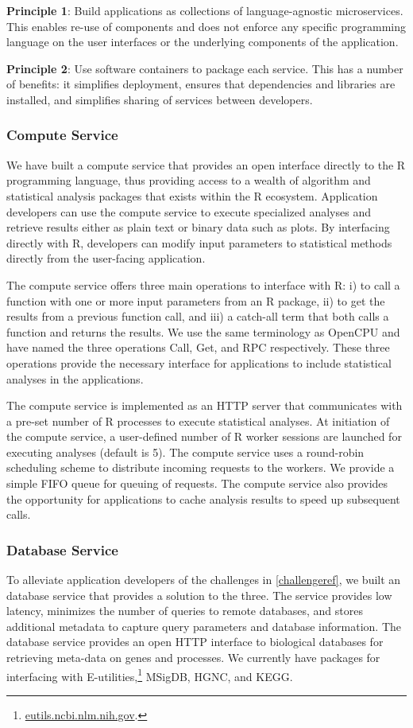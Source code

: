 \textbf{Principle 1}: Build applications as collections of language-agnostic
microservices. This enables re-use of components and does not enforce any
specific programming language on the user interfaces or the underlying
components of the application. 

\textbf{Principle 2}: Use software containers to package each service. This has
a number of benefits: it simplifies deployment, ensures that dependencies and
libraries are installed, and  simplifies sharing of services between
developers. 

\subsubsection{Compute Service}
We have built a compute service that provides an open interface directly to the
R programming language, thus providing access to a wealth of algorithm and
statistical analysis packages that exists within the R ecosystem.  
Application developers can use the compute service to execute specialized
analyses and retrieve results either as plain text or binary data such as plots.
By interfacing directly with R, developers can modify input parameters to
statistical methods directly from the user-facing application. 

The compute service offers three main operations to interface with R: i) to call
a function with one or more input parameters from an R package, ii) to get the
results from a previous function call, and iii) a catch-all term that both calls
a function and returns the results.  We use the same terminology as
OpenCPU\cite{opencpu} and have named the three operations Call, Get, and RPC
respectively. These three operations provide the necessary interface for
applications to include statistical analyses in the applications.

The compute service is implemented as an HTTP server that communicates with a
pre-set number of R processes to execute statistical analyses. 
At initiation of the compute service, a user-defined number of R worker sessions
are launched for executing analyses (default is 5).  
The compute service uses a round-robin scheduling scheme to distribute incoming
requests to the workers. We provide a simple FIFO queue for queuing of requests.
The compute service also provides the opportunity for applications to cache
analysis results to speed up subsequent calls. 

\subsubsection{Database Service} 
To alleviate application developers of the challenges in \ref{challengeref}, we
built an database service that provides a solution to the three. The service
provides low latency, minimizes the number of queries to remote databases, and
stores additional metadata to capture query parameters and database information.
The database service provides an open HTTP interface to biological databases for
retrieving meta-data on genes and processes.  We currently have packages for
interfacing with E-utilities,\footnote{\url{eutils.ncbi.nlm.nih.gov}.} MSigDB,
HGNC, and KEGG.

